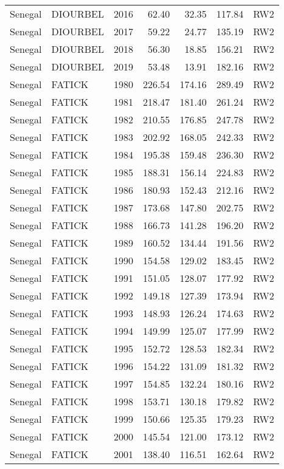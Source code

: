 \begin{longtable}{lllrrrl}
  Senegal & DIOURBEL & 2016 & 62.40 & 32.35 & 117.84 & RW2 \\ 
  Senegal & DIOURBEL & 2017 & 59.22 & 24.77 & 135.19 & RW2 \\ 
  Senegal & DIOURBEL & 2018 & 56.30 & 18.85 & 156.21 & RW2 \\ 
  Senegal & DIOURBEL & 2019 & 53.48 & 13.91 & 182.16 & RW2 \\ 
  Senegal & FATICK & 1980 & 226.54 & 174.16 & 289.49 & RW2 \\ 
  Senegal & FATICK & 1981 & 218.47 & 181.40 & 261.24 & RW2 \\ 
  Senegal & FATICK & 1982 & 210.55 & 176.85 & 247.78 & RW2 \\ 
  Senegal & FATICK & 1983 & 202.92 & 168.05 & 242.33 & RW2 \\ 
  Senegal & FATICK & 1984 & 195.38 & 159.48 & 236.30 & RW2 \\ 
  Senegal & FATICK & 1985 & 188.31 & 156.14 & 224.83 & RW2 \\ 
  Senegal & FATICK & 1986 & 180.93 & 152.43 & 212.16 & RW2 \\ 
  Senegal & FATICK & 1987 & 173.68 & 147.80 & 202.75 & RW2 \\ 
  Senegal & FATICK & 1988 & 166.73 & 141.28 & 196.20 & RW2 \\ 
  Senegal & FATICK & 1989 & 160.52 & 134.44 & 191.56 & RW2 \\ 
  Senegal & FATICK & 1990 & 154.58 & 129.02 & 183.45 & RW2 \\ 
  Senegal & FATICK & 1991 & 151.05 & 128.07 & 177.92 & RW2 \\ 
  Senegal & FATICK & 1992 & 149.18 & 127.39 & 173.94 & RW2 \\ 
  Senegal & FATICK & 1993 & 148.93 & 126.24 & 174.63 & RW2 \\ 
  Senegal & FATICK & 1994 & 149.99 & 125.07 & 177.99 & RW2 \\ 
  Senegal & FATICK & 1995 & 152.72 & 128.53 & 182.34 & RW2 \\ 
  Senegal & FATICK & 1996 & 154.22 & 131.09 & 181.32 & RW2 \\ 
  Senegal & FATICK & 1997 & 154.85 & 132.24 & 180.16 & RW2 \\ 
  Senegal & FATICK & 1998 & 153.71 & 130.18 & 179.82 & RW2 \\ 
  Senegal & FATICK & 1999 & 150.66 & 125.35 & 179.23 & RW2 \\ 
  Senegal & FATICK & 2000 & 145.54 & 121.00 & 173.12 & RW2 \\ 
  Senegal & FATICK & 2001 & 138.40 & 116.51 & 162.64 & RW2 \\ 

\end{longtable}
